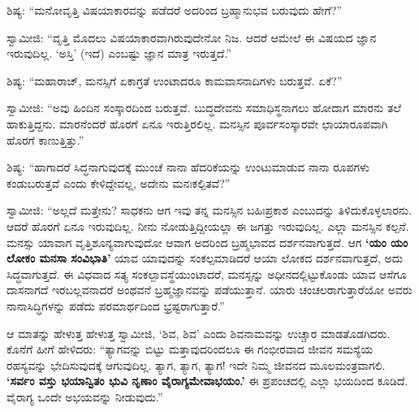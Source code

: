  ಶಿಷ್ಯ: “ಮನೋವೃತ್ತಿ ವಿಷಯಾಕಾರವನ್ನು ಪಡೆದರೆ ಅದರಿಂದ ಬ್ರಹ್ಮಾನುಭವ ಬರುವುದು ಹೇಗೆ?” 

 ಸ್ವಾಮೀಜಿ: “ವೃತ್ತಿ ಮೊದಲು ವಿಷಯಾಕಾರವಾಗಿರುವುದೇನೋ ನಿಜ. ಆದರೆ ಆಮೇಲೆ ಈ ವಿಷಯದ ಜ್ಞಾನ ಇರುವುದಿಲ್ಲ. ‘ಅಸ್ತಿ’ (ಇದೆ) ಎಂಬಷ್ಟು ಜ್ಞಾನ ಮಾತ್ರ ಇರುತ್ತದೆ.” 

 ಶಿಷ್ಯ: “ಮಹಾರಾಜ್, ಮನಸ್ಸಿಗೆ ಏಕಾಗ್ರತೆ ಉಂಟಾದರೂ ಕಾಮವಾಸನಾದಿಗಳು ಬರುತ್ತವೆ. ಏಕೆ?” 

 ಸ್ವಾಮೀಜಿ: “ಅವು ಹಿಂದಿನ ಸಂಸ್ಕಾರದಿಂದ ಬರುತ್ತವೆ. ಬುದ್ಧದೇವನು ಸಮಾಧಿಸ್ಥನಾಗಲು ಹೋದಾಗ ಮಾರನು ತಲೆ ಹಾಕುತ್ತಿದ್ದನು. ಮಾರನೆಂದರೆ ಹೊರಗೆ ಏನೂ ಇರುತ್ತಿರಲಿಲ್ಲ. ಮನಸ್ಸಿನ ಪೂರ್ವಸಂಸ್ಕಾರವೇ ಛಾಯಾರೂಪವಾಗಿ ಹೊರಗೆ ಕಾಣುತ್ತಿತ್ತು.” 

 ಶಿಷ್ಯ: “ಹಾಗಾದರೆ ಸಿದ್ಧನಾಗುವುದಕ್ಕೆ ಮುಂಚೆ ನಾನಾ ಹೆದರಿಕೆಯನ್ನು ಉಂಟುಮಾಡುವ ನಾನಾ ರೂಪಗಳು ಕಂಡುಬರುತ್ತವೆ ಎಂದು ಕೇಳಿದ್ದೇವಲ್ಲ, ಅದೇನು ಮನಃಕಲ್ಪಿತವೆ?” 

 ಸ್ವಾಮೀಜಿ: “ಅಲ್ಲದೆ ಮತ್ತೇನು? ಸಾಧಕನು ಆಗ ಇವು ತನ್ನ ಮನಸ್ಸಿನ ಬಹಿಃಪ್ರಕಾಶ ಎಂಬುದನ್ನು ತಿಳಿದುಕೊಳ್ಳಲಾರನು. ಆದರೆ ಹೊರಗೆ ಏನೂ ಇರುವುದಿಲ್ಲ. ನೀನು ನೋಡುತ್ತಿದ್ದೀಯಲ್ಲಾ ಈ ಜಗತ್ತು ಇರುವುದಿಲ್ಲ. ಎಲ್ಲಾ ಮನಸ್ಸಿನ ಕಲ್ಪನೆ. ಮನಸ್ಸು ಯಾವಾಗ ವೃತ್ತಿಶೂನ್ಯವಾಗುವುದೋ ಆವಾಗ ಅದರಿಂದ ಬ್ರಹ್ಮಭಾವದ ದರ್ಶನವಾಗುತ್ತದೆ. ಆಗ \textbf{‘ಯಂ ಯಂ ಲೋಕಂ ಮನಸಾ ಸಂವಿಭಾತಿ’} ಯಾವ ಯಾವುದನ್ನು ಸಂಕಲ್ಪಮಾಡಿದರೆ ಆಯಾ ಲೋಕದ ದರ್ಶನವಾಗುತ್ತದೆ, ಅದು ಸಿದ್ಧವಾಗುತ್ತದೆ. ಈ ವಿಧವಾದ ಸತ್ಯ ಸಂಕಲ್ಪಾವಸ್ಥೆಯುಂಟಾದರೆ, ಮನಸ್ಸನ್ನು ಅಧೀನದಲ್ಲಿಟ್ಟುಕೊಂಡು ಯಾವ ಆಸೆಗೂ ದಾಸನಾಗದೆ ಇರಬಲ್ಲವನಾದರೆ ಅಂಥವನೆ ಬ್ರಹ್ಮಜ್ಞಾನವನ್ನು ಪಡೆಯುತ್ತಾನೆ. ಯಾರು ಚಂಚಲರಾಗುತ್ತಾರೆಯೋ ಅವರು ನಾನಾಸಿದ್ಧಿಗಳನ್ನು ಪಡೆದು ಪರಮಾರ್ಥದಿಂದ ಭ್ರಷ್ಟರಾಗುತ್ತಾರೆ.” 

 ಆ ಮಾತನ್ನು ಹೇಳುತ್ತ ಹೇಳುತ್ತ ಸ್ವಾಮೀಜಿ, ‘ಶಿವ, ಶಿವ’ ಎಂದು ಶಿವನಾಮವನ್ನು ಉಚ್ಚಾರ ಮಾಡತೊಡಗಿದರು. ಕೊನೆಗೆ ಹೀಗೆ ಹೇಳಿದರು: “ತ್ಯಾಗವನ್ನು ಬಿಟ್ಟು ಮತ್ತಾವುದರಿಂದಲೂ ಈ ಗಂಭೀರವಾದ ಜೀವನ ಸಮಸ್ಯೆಯ ರಹಸ್ಯವನ್ನು ಭೇದಿಸುವುದಕ್ಕೆ ಆಗುವುದಿಲ್ಲ. ತ್ಯಾಗ, ತ್ಯಾಗ, ತ್ಯಾಗ! ಇದೇ ನಿಮ್ಮ ಜೀವನದ ಮೂಲಮಂತ್ರವಾಗಲಿ. \textbf{‘ಸರ್ವಂ ವಸ್ತು ಭಯಾನ್ವಿತಂ ಭುವಿ ನೃಣಾಂ ವೈರಾಗ್ಯಮೇವಾಭಯಂ.’} ಈ ಪ್ರಪಂಚದಲ್ಲಿ ಎಲ್ಲಾ ಭಯದಿಂದ ಕೂಡಿದೆ. ವೈರಾಗ್ಯ ಒಂದೇ ಅಭಯವನ್ನು ನೀಡುವುದು.” 

